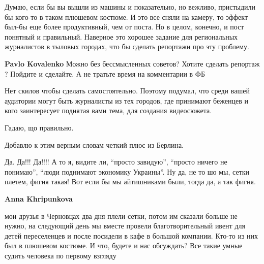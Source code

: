  
 
 
 
 
\zzSecCmt

\begin{itemize} %

Думаю, если бы вы вышли из машины и показательно, но вежливо, пристыдили бы
кого-то в таком плюшевом костюме. И это все сняли на камеру, то эффект был-бы
еще более продуктивный, чем от поста. Но в целом, конечно, и пост понятный и
правильный. Наверное это хорошее задание для региональных журналистов в тыловых
городах, что бы сделать репортажи про эту проблему.

\begin{itemize} %
\textbf{Pavlo Kovalenko} Можно без бессмысленных советов?
Хотите сделать репортаж ? Пойдите и сделайте.
А не тратьте время на комментарии в ФБ


Нет скилов чтобы сделать самостоятельно. Поэтому подумал, что среди вашей
аудитории могут быть журналисты из тех городов, где принимают беженцев и кого
заинтересует поднятая вами тема, для создания видеосюжета.

\end{itemize} %

Гадаю, що правильно.

Добавлю к этим верным словам четкий плюс из Берлина.


Да. Да!!! Да!!!! А то я, видите ли, \enquote{просто завидую}, \enquote{просто ничего не
понимаю}, \enquote{люди поднимают экономику Украины}. Ну да, не то шо мы, сетки плетем,
фигня такая! Вот если бы мы айтишниками были, тогда да, а так фигня.

\begin{itemize} %
\textbf{Anna Khripunkova} 

мои друзья в Черновцах два дня плели сетки, потом им сказали больше не нужно,
на следующий день мы вместе провели благотворительный ивент для детей
переселенцев и после посидели в кафе в большой компании. Кто-то из них был в
плюшевом костюме. И что, будете и нас обсуждать? Все такие умные судить
человека по первому взгляду


\end{itemize}
\end{itemize}
